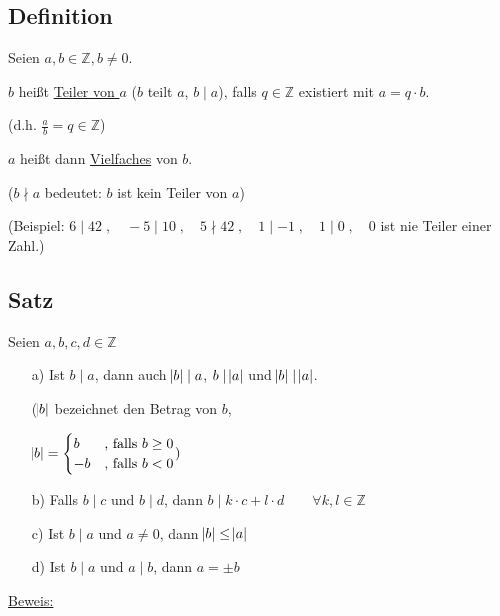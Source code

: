 \documentclass[a4paper, 12pt, twoside] {article}
\begin{document}
\subsection{Definition}

Seien $a,b \in \mathbb{Z}, b \neq 0$.

$b$ heißt \underline{Teiler von $a$} ($b$ teilt $a$, $b \mid a$), falls $q \in \mathbb{Z}$ existiert mit $a = q \cdot b$.

(d.h. $\frac{a}{b}= q \in \mathbb{Z}$)

$a$ heißt dann \underline{Vielfaches} von $b$.

($b \nmid a$ bedeutet: $b$ ist kein Teiler von $a$)

(Beispiel: $6 \mid 42 \;, \quad -5 \mid 10 \;, \quad 5 \nmid 42 \;, \quad 1 \mid -1 \;, \quad 1 \mid 0 \;, \quad 0$ ist nie Teiler einer Zahl.)

\subsection{Satz}

Seien $a,b,c,d \in \mathbb{Z}$

\begin{itemize}

\item[a)] Ist $b \mid a$, dann auch $\abs{b} \mid a$, $b \mid \abs{a}$ und $\abs{b} \mid \abs{a}$.

($\abs{b}$ bezeichnet den Betrag von $b$,

$\abs{b} = \begin{cases}
b & \text{, falls } b \geq 0 \\
-b & \text{, falls }  b < 0
\end{cases} )$

\item[b)] Falls $b \mid c$ und $b \mid d$, dann $b \mid k \cdot c + l \cdot d \qquad \forall k,l \in \mathbb{Z}$

\item[c)] Ist $b \mid a$ und $a \neq 0$, dann $\abs{b} \leq \abs{a}$

\item[d)] Ist $b \mid a$ und $a \mid b$, dann $a = \pm b$

\end{itemize}

\underline{Beweis:}
\end{document}
